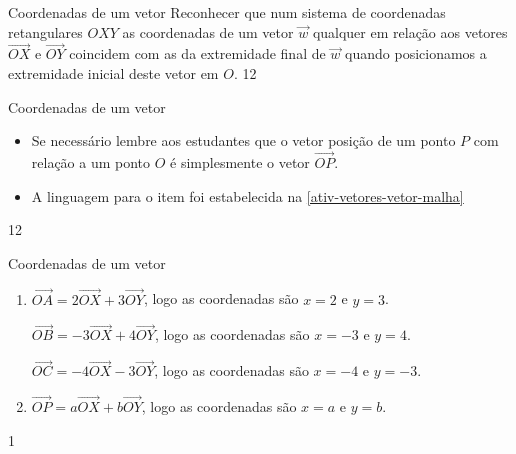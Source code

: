 \begin{objectives}{Coordenadas de um vetor}
{
Reconhecer que num sistema de coordenadas retangulares \(OXY\) as coordenadas de um vetor \(\vec{w}\) qualquer em relação aos vetores \(\overrightarrow{OX}\) e \(\overrightarrow{OY}\) coincidem com as da extremidade final de \(\vec{w}\) quando posicionamos a extremidade inicial deste vetor em \(O\).
}{1}{2}
\end{objectives}
\begin{sugestions}{Coordenadas de um vetor}
{
\begin{itemize}
\item {} 
Se necessário lembre aos estudantes que o vetor posição de um ponto \(P\) com relação a um ponto \(O\) é simplesmente o vetor \(\overrightarrow{OP}\).

\item {} 
A linguagem para o item  foi estabelecida na \ref{ativ-vetores-vetor-malha}

\end{itemize}
}{1}{2}
\end{sugestions}
\clearmargin
\begin{answer}{Coordenadas de um vetor}
{
\begin{enumerate}
\item {} 
\(\overrightarrow{OA} = 2\overrightarrow{OX} + 3\overrightarrow{OY}\), logo as coordenadas são \(x=2\) e \(y=3\).

\(\overrightarrow{OB} = -3\overrightarrow{OX} + 4\overrightarrow{OY}\), logo as coordenadas são \(x=-3\) e \(y=4\).

\(\overrightarrow{OC} = -4\overrightarrow{OX} - 3\overrightarrow{OY}\), logo as coordenadas são \(x=-4\) e \(y=-3\).

\item {} 
\(\overrightarrow{OP} = a\overrightarrow{OX} + b\overrightarrow{OY}\), logo as coordenadas são \(x=a\) e \(y=b\).

\end{enumerate}
}{1}
\end{answer}

